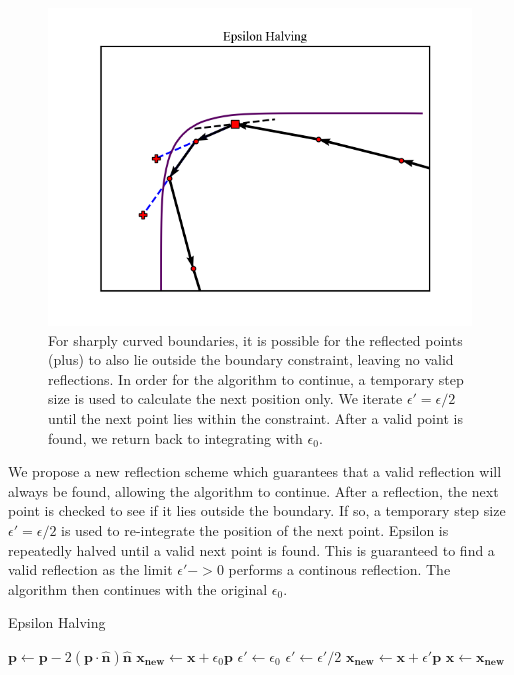 \documentclass[11pt]{article}
\begin{document}
    \begin{figure}[t!]
        \center
        \includegraphics[width=\linewidth]{../figures/EpsilonHalving}
        \caption{
        For sharply curved boundaries, it is possible for the reflected points (plus) to also lie outside the boundary
        constraint, leaving no valid reflections.
        In order for the algorithm to continue, a temporary step size is used to calculate the next position only.
        We iterate $\epsilon' = \epsilon / 2$ until the next point lies within the constraint.
        After a valid point is found, we return back to integrating with $\epsilon_0$.
        }\label{fig:epsilon_halving}
    \end{figure}

    We propose a new reflection scheme which guarantees that a valid reflection will always be found, allowing the
    algorithm to continue.
    After a reflection, the next point is checked to see if it lies outside the boundary.
    If so, a temporary step size $\epsilon' = \epsilon / 2$ is used to re-integrate the position of the next point.
    Epsilon is repeatedly halved until a valid next point is found.
    This is guaranteed to find a valid reflection as the limit $\epsilon' -> 0$ performs a continous reflection.
    The algorithm then continues with the original $\epsilon_0$. \\

    \begin{algorithm}
        \caption{Epsilon Halving}
        \label{alg:epsilon_halving}
        \begin{algorithmic}
            \STATE {}
            \STATE $\mathbf{p} \gets \mathbf{p} - 2 \left(\mathbf{p} \cdot \hat{ \mathbf{n} } \right) \hat{ \mathbf{n} }$
            \STATE
            \STATE $ \mathbf{x_{new}} \gets \mathbf{x} + \epsilon_0 \mathbf{p}$
            \STATE $ \epsilon' \gets \epsilon_0$
            \STATE
                \STATE $\epsilon' \gets \epsilon' / 2$
                \STATE $ \mathbf{x_{new}} \gets \mathbf{x} + \epsilon' \mathbf{p}$
            \ENDWHILE
            \STATE
            \STATE $\mathbf{x} \gets \mathbf{x_{new}}$
        \end{algorithmic}
    \end{algorithm}
\end{document}
